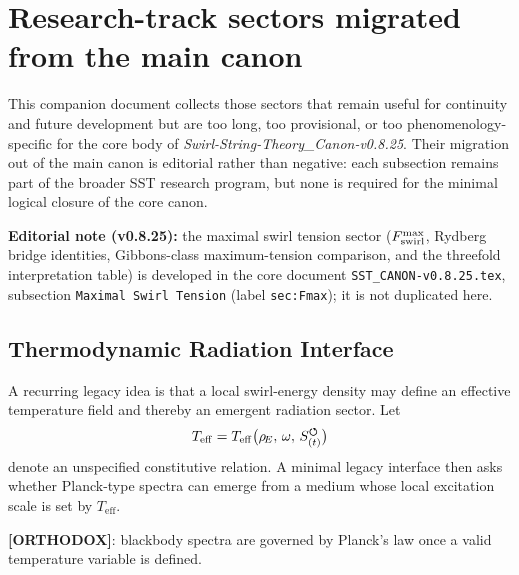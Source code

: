 \makeatletter
{}
\makeatother


\section{Research-track sectors migrated from the main canon}

\noindent
This companion document collects those sectors that remain useful for continuity and future development but are too long, too provisional, or too phenomenology-specific for the core body of \textit{Swirl-String-Theory\_Canon-v0.8.25}. Their migration out of the main canon is editorial rather than negative: each subsection remains part of the broader SST research program, but none is required for the minimal logical closure of the core canon.

\medskip
\noindent
\textbf{Editorial note (v0.8.25):} the maximal swirl tension sector ($F_{\rm swirl}^{\max}$, Rydberg bridge identities, Gibbons-class maximum-tension comparison, and the threefold interpretation table) is developed in the core document \texttt{SST\_CANON-v0.8.25.tex}, subsection \texttt{Maximal Swirl Tension} (label \texttt{sec:Fmax}); it is not duplicated here.

\medskip








\subsection{Thermodynamic Radiation Interface}
A recurring legacy idea is that a local swirl-energy density may define an effective temperature field and thereby an emergent radiation sector. Let
\begin{align}
    T_{\mathrm{eff}} = T_{\mathrm{eff}}\big(\rho_{\!E},\, \omega,\, S_{(t)}^{\boldsymbol{\circlearrowleft}}\big)
\end{align}
denote an unspecified constitutive relation. A minimal legacy interface then asks whether Planck-type spectra can emerge from a medium whose local excitation scale is set by $T_{\mathrm{eff}}$.

\textbf{[ORTHODOX]}: blackbody spectra are governed by Planck's law once a valid temperature variable is defined.

